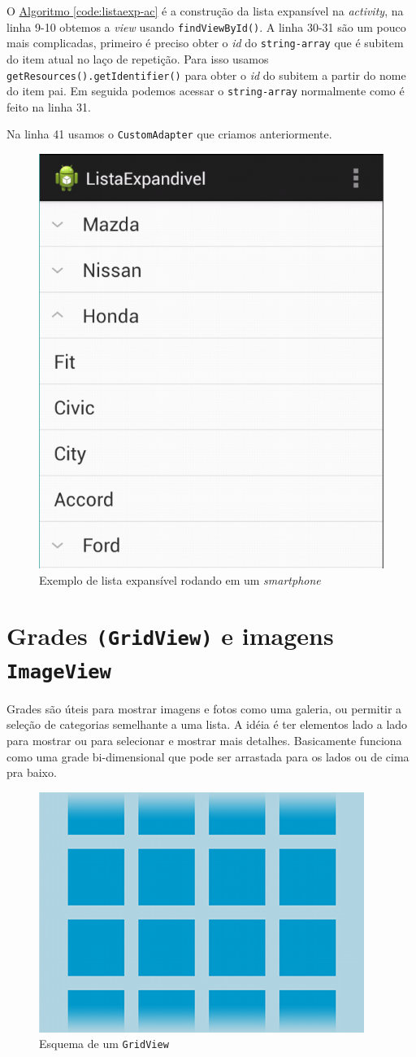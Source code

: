 \documentclass[a4paper,12pt,brazil,oneside]{book}
\begin{document}
\begin{singlespace}
O \hyperref[code:listaexp-ac]{Algoritmo \ref*{code:listaexp-ac}} é a construção da lista expansível na \emph{activity}, na linha 9-10 obtemos a \emph{view} usando \texttt{findViewById()}. A linha 30-31 são um pouco mais complicadas, primeiro é preciso obter o \emph{id} do \texttt{string-array} que é subitem do item atual no laço de repetição. Para isso usamos \texttt{getResources().getIdentifier()} para obter o \emph{id} do subitem a partir do nome do item pai. Em seguida podemos acessar o \texttt{string-array} normalmente como é feito na linha 31.

 Na linha 41 usamos o \texttt{CustomAdapter} que criamos anteriormente.

\begin{figure}[H]
  \centering
  \includegraphics[width=.475\textwidth]{figuras/design/listaexpandivel.png}
  \caption{Exemplo de lista expansível rodando em um \emph{smartphone}}
  \label{fig:e12}
\end{figure}

\newpage
\section{Grades \texttt{(GridView)} e imagens \texttt{ImageView}}

Grades são úteis para mostrar imagens e fotos como uma galeria, ou permitir a seleção de categorias semelhante a uma lista. A idéia é ter elementos lado a lado para mostrar ou para selecionar e mostrar mais detalhes. Basicamente funciona como uma grade bi-dimensional que pode ser arrastada para os lados ou de cima pra baixo. 

\begin{figure}[H]
  \centering
  \includegraphics[width=.475\textwidth]{figuras/design/gridview.png}
  \caption{Esquema de um \texttt{GridView}}
  \label{fig:e14}
\end{figure}


\end{singlespace}
\end{document}

